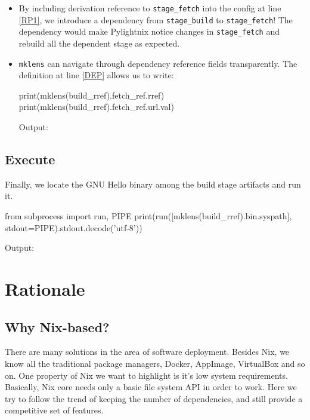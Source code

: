 \documentclass{article}
\begin{document}
\begin{itemize}
  \item By including derivation reference to \texttt{stage\_fetch} into
    the config at line \ref{RP1}, we introduce a dependency from
    \texttt{stage\_build} to \texttt{stage\_fetch}! The dependency would
    make Pylightnix notice changes in \texttt{stage\_fetch} and rebuild all
    the dependent stage as expected.

  \item \texttt{mklens} can navigate through dependency reference fields
    transparently. The definition at line \ref{DEP} allows us to write:

    \begin{pythontexcode}
    print(mklens(build_rref).fetch_ref.rref)
    print(mklens(build_rref).fetch_ref.url.val)
    \end{pythontexcode}

    Output:

    \mysmallstdout

\end{itemize}


\pagebreak
\subsection{Execute}

Finally, we locate the GNU Hello binary among the build stage artifacts and
run it.

\begin{pythontexcode}
from subprocess import run, PIPE
print(run([mklens(build_rref).bin.syspath], stdout=PIPE).stdout.decode('utf-8'))
\end{pythontexcode}

Output:

\mystdout

\section{Rationale}

\subsection{Why Nix-based?}

There are many solutions in the area of software deployment.
Besides Nix, we know all the traditional package managers, Docker, AppImage,
VirtualBox and so on. One property of Nix we want to highlight is it's low
system requirements. Basically, Nix core needs only a basic file system API
in order to work. Here we try to follow the trend of keeping the number of
dependencies, and still provide a competitive set of features.
\end{document}
